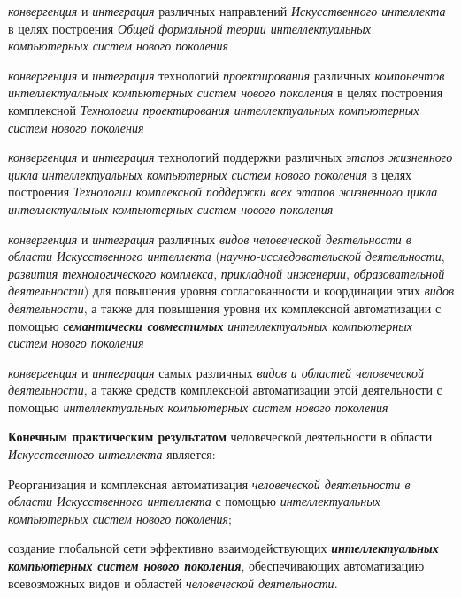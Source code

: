 \begin{textitemize}
	\item
	\textit{конвергенция} и \textit{интеграция} различных направлений \textit{Искусственного интеллекта} в целях построения \textit{Общей формальной теории интеллектуальных компьютерных систем нового поколения }
	\item
	\textit{конвергенция} и \textit{интеграция} технологий \textit{проектирования} различных \textit{компонентов интеллектуальных компьютерных систем нового поколения} в целях построения комплексной \textit{Технологии проектирования интеллектуальных компьютерных систем нового поколения }
	\item
	\textit{конвергенция} и \textit{интеграция} технологий поддержки различных \textit{этапов жизненного цикла} \textit{интеллектуальных компьютерных систем нового поколения} в целях построения \textit{Технологии комплексной поддержки всех этапов жизненного цикла интеллектуальных компьютерных систем нового поколения}
	\item
	\textit{конвергенция} и \textit{интеграция} различных \textit{видов человеческой деятельности в области Искусственного интеллекта} (\textit{научно-исследовательской деятельности}, \textit{развития технологического комплекса}, \textit{прикладной инженерии}, \textit{образовательной деятельности}) для повышения уровня согласованности и координации этих \textit{видов деятельности}, а также для повышения уровня их комплексной автоматизации с помощью \textbf{\textit{семантически совместимых}} \textit{интеллектуальных компьютерных систем нового поколения}
	\item
	\textit{конвергенция} и \textit{интеграция} самых различных \textit{видов и областей человеческой деятельности}, а также средств комплексной автоматизации этой деятельности с помощью \textit{интеллектуальных компьютерных систем нового поколения}
\end{textitemize}

\textbf{Конечным практическим результатом} человеческой деятельности в области \textit{Искусственного интеллекта} является:

\begin{textitemize}
	\item
	Реорганизация и комплексная автоматизация \textit{человеческой деятельности в области Искусственного интеллекта} с помощью \textit{интеллектуальных компьютерных систем нового поколения};
	\item
	 создание глобальной сети эффективно взаимодействующих \textbf{\textit{интеллектуальных компьютерных систем нового поколения}}, обеспечивающих  автоматизацию всевозможных видов и областей \textit{человеческой деятельности}.
\end{textitemize}

